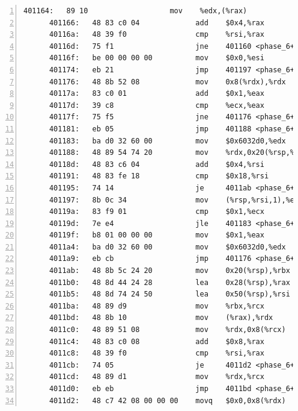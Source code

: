 \documentclass{article}
\begin{document}
\begin{lstlisting}[title = bomb的反汇编代码及部分注释, xleftmargin = 2em,xrightmargin = 2em, aboveskip = 1em, numbers = left, basicstyle=\scriptsize\ttfamily, numberstyle=\scriptsize]
      401164:	89 10                	mov    %edx,(%rax)					; M[%rax] = %edx;
      401166:	48 83 c0 04          	add    $0x4,%rax					; %rax += 4;
      40116a:	48 39 f0             	cmp    %rsi,%rax					; if (%rax != %rsi)
      40116d:	75 f1                	jne    401160 <phase_6+0x6c>		;	  goto #546;
      40116f:	be 00 00 00 00       	mov    $0x0,%esi					; %esi = 0;
      401174:	eb 21                	jmp    401197 <phase_6+0xa3>		; goto #564;
      401176:	48 8b 52 08          	mov    0x8(%rdx),%rdx				; %rdx = M[%rdx + 8];
      40117a:	83 c0 01             	add    $0x1,%eax					; %eax++;
      40117d:	39 c8                	cmp    %ecx,%eax					; if (%eax != %ecx)
      40117f:	75 f5                	jne    401176 <phase_6+0x82>		;	  goto #554;
      401181:	eb 05                	jmp    401188 <phase_6+0x94>		; goto #560;
      401183:	ba d0 32 60 00       	mov    $0x6032d0,%edx				; %edx = 0x6032d0;
      401188:	48 89 54 74 20       	mov    %rdx,0x20(%rsp,%rsi,2)		; M[%rsp + %rsi * 2 + 0x20] = %rdx;
      40118d:	48 83 c6 04          	add    $0x4,%rsi					; %rsi += 4;
      401191:	48 83 fe 18          	cmp    $0x18,%rsi					; if (%rsi == 0x18)
      401195:	74 14                	je     4011ab <phase_6+0xb7>		;	  goto #570;
      401197:	8b 0c 34             	mov    (%rsp,%rsi,1),%ecx			; %ecx = M[%rsp + %rsi];
      40119a:	83 f9 01             	cmp    $0x1,%ecx					; if (%ecx <= 1)
      40119d:	7e e4                	jle    401183 <phase_6+0x8f>		;	  goto #559;
      40119f:	b8 01 00 00 00       	mov    $0x1,%eax					; %eax = 1;
      4011a4:	ba d0 32 60 00       	mov    $0x6032d0,%edx				; %edx = 0x6032d0;
      4011a9:	eb cb                	jmp    401176 <phase_6+0x82>		; goto #554;
      4011ab:	48 8b 5c 24 20       	mov    0x20(%rsp),%rbx				; %rbx = M[%rsp + 0x20];
      4011b0:	48 8d 44 24 28       	lea    0x28(%rsp),%rax				; %rax = %rsp + 0x28;
      4011b5:	48 8d 74 24 50       	lea    0x50(%rsp),%rsi				; %rsi = %rsp + 0x50;
      4011ba:	48 89 d9             	mov    %rbx,%rcx					; %rcx = %rbx;
      4011bd:	48 8b 10             	mov    (%rax),%rdx					; %rdx = M[%rax];
      4011c0:	48 89 51 08          	mov    %rdx,0x8(%rcx)				; M[%rcx + 0x8] = %rdx;
      4011c4:	48 83 c0 08          	add    $0x8,%rax					; %rax += 8;
      4011c8:	48 39 f0             	cmp    %rsi,%rax					; if (%rax == %rsi)
      4011cb:	74 05                	je     4011d2 <phase_6+0xde>		;	  goto #581;
      4011cd:	48 89 d1             	mov    %rdx,%rcx					; %rcx = %rdx;
      4011d0:	eb eb                	jmp    4011bd <phase_6+0xc9>		; goto #574;
      4011d2:	48 c7 42 08 00 00 00 	movq   $0x0,0x8(%rdx)				; M[%rdx + 8] = 0;

\end{lstlisting}
\end{document}
